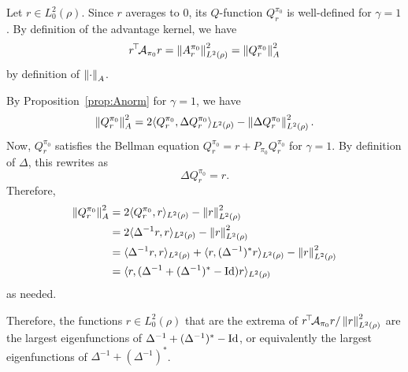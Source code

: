 \documentclass[11pt,a4paper]{article}
\newcommand{\AK}{\mathcal{A}}
\begin{document}
\begin{dem}
Let $r\in L^2_0(\rho)$. Since $r$ averages to $0$, its $Q$-function
$Q^{\pi_0}_r$ is well-defined for $\gamma=1$. By definition of the
advantage kernel, we have
\begin{equation}
\transp{r}
\AK_{\pi_0}r=\norm{A^{\pi_0}_r}^2_{L^2(\rho)}=\norm{Q^{\pi_0}_r}^2_A
\end{equation}
by definition of $\left\lVert\cdot\right\rVert_A$.

By Proposition~\ref{prop:Anorm} for $\gamma=1$, we have
\begin{equation}
\left\lVert Q^{\pi_0}_r\right\rVert^2_A=2\langle Q^{\pi_0}_r,\Delta Q^{\pi_0}_r
\rangle_{L^2(\rho)}-\left\lVert\Delta Q^{\pi_0}_r\right\rVert^2_{L^2(\rho)}.
\end{equation}
Now, $Q^{\pi_0}_r$ satisfies the Bellman equation
$Q^{\pi_0}_r=r+P_{\pi_0} Q^{\pi_0}_r$ for $\gamma=1$. By definition of
$\Delta$, this rewrites as
\begin{equation}
\Delta Q^{\pi_0}_r=r.
\end{equation}
Therefore,
\begin{align*}
\left\lVert Q^{\pi_0}_r\right\rVert^2_A
&=2 \langle Q^{\pi_0}_r,r\rangle_{L^2(\rho)}-\left\lVert r\right\rVert^2_{L^2(\rho)}
\\&=2\langle \Delta^{-1} r,r\rangle_{L^2(\rho)}-\left\lVert r\right\rVert^2_{L^2(\rho)}
\\&=\langle \Delta^{-1} r,r\rangle_{L^2(\rho)}+\langle
r,(\Delta^{-1})^{\ast} r\rangle_{L^2(\rho)}-\left\lVert r\right\rVert^2_{L^2(\rho)} 
\\&=\langle r, (\Delta^{-1}+(\Delta^{-1})^{\ast}-\operatorname{Id})r\rangle_{L^2(\rho)}
\end{align*}
as needed.

Therefore, the functions $r\in L^2_0(\rho)$ that are the extrema of
$\transp{r}\AK_{\pi_0}r/\norm{r}^2_{L^2(\rho)}$ are the largest
eigenfunctions of $\Delta^{-1}+(\Delta^{-1})^{\ast}-\operatorname{Id}$, or equivalently
the
largest eigenfunctions of $\Delta^{-1}+(\Delta^{-1})^{\ast}$.
\end{dem}
\end{document}
